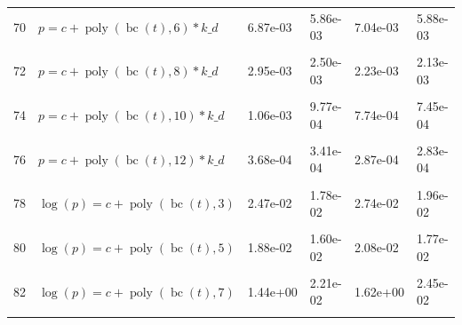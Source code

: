 \documentclass[12pt,a4paper]{article}
\DeclareMathOperator{\bc}{bc}
\DeclareMathOperator{\poly}{poly}
\begin{document}
\begin{longtable}[t]{ll>{\raggedleft\arraybackslash}p{2cm}>{\raggedleft\arraybackslash}p{2cm}>{\raggedleft\arraybackslash}p{2cm}>{\raggedleft\arraybackslash}p{2cm}}
70 & $p = c + \poly\left( \bc(t), 6 \right) * k\_d$ & 6.87e-03 & 5.86e-03 & 7.04e-03 & 5.88e-03\\
\cellcolor{gray!6}{71} & \cellcolor{gray!6}{$p = c + \poly\left( \bc(t), 7 \right) * k\_d$} & \cellcolor{gray!6}{5.73e-03} & \cellcolor{gray!6}{4.63e-03} & \cellcolor{gray!6}{4.68e-03} & \cellcolor{gray!6}{4.24e-03}\\
72 & $p = c + \poly\left( \bc(t), 8 \right) * k\_d$ & 2.95e-03 & 2.50e-03 & 2.23e-03 & 2.13e-03\\
\cellcolor{gray!6}{73} & \cellcolor{gray!6}{$p = c + \poly\left( \bc(t), 9 \right) * k\_d$} & \cellcolor{gray!6}{2.57e-03} & \cellcolor{gray!6}{2.29e-03} & \cellcolor{gray!6}{2.46e-03} & \cellcolor{gray!6}{2.27e-03}\\
74 & $p = c + \poly\left( \bc(t), 10 \right) * k\_d$ & 1.06e-03 & 9.77e-04 & 7.74e-04 & 7.45e-04\\
\cellcolor{gray!6}{75} & \cellcolor{gray!6}{$p = c + \poly\left( \bc(t), 11 \right) * k\_d$} & \cellcolor{gray!6}{8.12e-04} & \cellcolor{gray!6}{7.20e-04} & \cellcolor{gray!6}{7.88e-04} & \cellcolor{gray!6}{6.93e-04}\\
76 & $p = c + \poly\left( \bc(t), 12 \right) * k\_d$ & 3.68e-04 & 3.41e-04 & 2.87e-04 & 2.83e-04\\
\cellcolor{gray!6}{77} & \cellcolor{gray!6}{$p = c + \poly\left( \bc(t), 13 \right) * k\_d$} & \cellcolor{gray!6}{2.83e-04} & \cellcolor{gray!6}{2.68e-04} & \cellcolor{gray!6}{2.80e-04} & \cellcolor{gray!6}{2.66e-04}\\
78 & $\log(p) = c + \poly\left( \bc(t), 3 \right)$ & 2.47e-02 & 1.78e-02 & 2.74e-02 & 1.96e-02\\
\cellcolor{gray!6}{79} & \cellcolor{gray!6}{$\log(p) = c + \poly\left( \bc(t), 4 \right)$} & \cellcolor{gray!6}{2.45e-02} & \cellcolor{gray!6}{2.42e-02} & \cellcolor{gray!6}{2.72e-02} & \cellcolor{gray!6}{2.68e-02}\\
80 & $\log(p) = c + \poly\left( \bc(t), 5 \right)$ & 1.88e-02 & 1.60e-02 & 2.08e-02 & 1.77e-02\\
\cellcolor{gray!6}{81} & \cellcolor{gray!6}{$\log(p) = c + \poly\left( \bc(t), 6 \right)$} & \cellcolor{gray!6}{1.66e-02} & \cellcolor{gray!6}{1.63e-02} & \cellcolor{gray!6}{1.83e-02} & \cellcolor{gray!6}{1.79e-02}\\
82 & $\log(p) = c + \poly\left( \bc(t), 7 \right)$ & 1.44e+00 & 2.21e-02 & 1.62e+00 & 2.45e-02\\
\cellcolor{gray!6}{83} & \cellcolor{gray!6}{$\log(p) = c + \poly\left( \bc(t), 8 \right)$} & \cellcolor{gray!6}{2.01e-02} & \cellcolor{gray!6}{1.83e-02} & \cellcolor{gray!6}{2.23e-02} & \cellcolor{gray!6}{2.02e-02}\\

\end{longtable}
\end{document}
